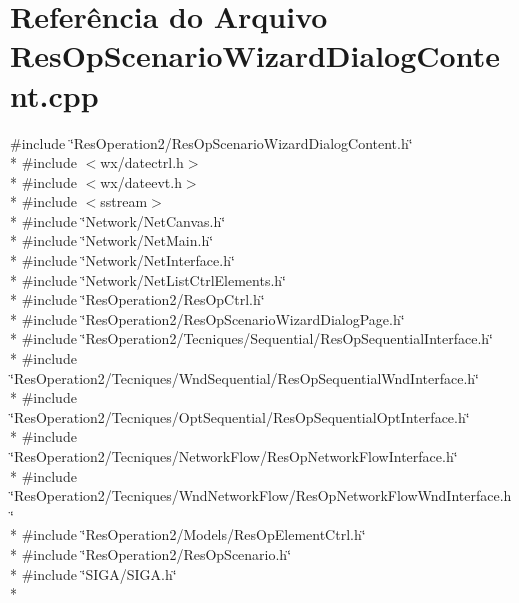 \section{Referência do Arquivo Res\+Op\+Scenario\+Wizard\+Dialog\+Content.\+cpp}
\label{_res_op_scenario_wizard_dialog_content_8cpp}
{\ttfamily \#include \char`\"{}Res\+Operation2/\+Res\+Op\+Scenario\+Wizard\+Dialog\+Content.\+h\char`\"{}}\\*
{\ttfamily \#include $<$wx/datectrl.\+h$>$}\\*
{\ttfamily \#include $<$wx/dateevt.\+h$>$}\\*
{\ttfamily \#include $<$sstream$>$}\\*
{\ttfamily \#include \char`\"{}Network/\+Net\+Canvas.\+h\char`\"{}}\\*
{\ttfamily \#include \char`\"{}Network/\+Net\+Main.\+h\char`\"{}}\\*
{\ttfamily \#include \char`\"{}Network/\+Net\+Interface.\+h\char`\"{}}\\*
{\ttfamily \#include \char`\"{}Network/\+Net\+List\+Ctrl\+Elements.\+h\char`\"{}}\\*
{\ttfamily \#include \char`\"{}Res\+Operation2/\+Res\+Op\+Ctrl.\+h\char`\"{}}\\*
{\ttfamily \#include \char`\"{}Res\+Operation2/\+Res\+Op\+Scenario\+Wizard\+Dialog\+Page.\+h\char`\"{}}\\*
{\ttfamily \#include \char`\"{}Res\+Operation2/\+Tecniques/\+Sequential/\+Res\+Op\+Sequential\+Interface.\+h\char`\"{}}\\*
{\ttfamily \#include \char`\"{}Res\+Operation2/\+Tecniques/\+Wnd\+Sequential/\+Res\+Op\+Sequential\+Wnd\+Interface.\+h\char`\"{}}\\*
{\ttfamily \#include \char`\"{}Res\+Operation2/\+Tecniques/\+Opt\+Sequential/\+Res\+Op\+Sequential\+Opt\+Interface.\+h\char`\"{}}\\*
{\ttfamily \#include \char`\"{}Res\+Operation2/\+Tecniques/\+Network\+Flow/\+Res\+Op\+Network\+Flow\+Interface.\+h\char`\"{}}\\*
{\ttfamily \#include \char`\"{}Res\+Operation2/\+Tecniques/\+Wnd\+Network\+Flow/\+Res\+Op\+Network\+Flow\+Wnd\+Interface.\+h\char`\"{}}\\*
{\ttfamily \#include \char`\"{}Res\+Operation2/\+Models/\+Res\+Op\+Element\+Ctrl.\+h\char`\"{}}\\*
{\ttfamily \#include \char`\"{}Res\+Operation2/\+Res\+Op\+Scenario.\+h\char`\"{}}\\*
{\ttfamily \#include \char`\"{}S\+I\+G\+A/\+S\+I\+G\+A.\+h\char`\"{}}\\*
